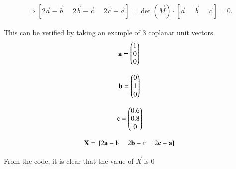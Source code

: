 \documentclass[journal]{IEEEtran}
\begin{document}
\begin{align}
\Rightarrow [2\vec{a} - \vec{b}\;\quad 2\vec{b} - \vec{c}\;\quad 2\vec{c} - \vec{a}] = \det(\vec{M}) \cdot [\vec{a}\;\quad \vec{b}\;\quad \vec{c}] = 0.
\end{align}


This can be verified by taking an example of 3 coplanar unit vectors.\\
\begin{align}
\mathbf{a} = \begin{pmatrix}1 \\ 0 \\ 0\end{pmatrix}
\end{align}

\begin{align}
\mathbf{b} = \begin{pmatrix}0 \\ 1 \\ 0\end{pmatrix}
\end{align}

\begin{align}
\mathbf{c} = \begin{pmatrix}0.6 \\ 0.8 \\ 0\end{pmatrix}
\end{align}

\begin{align}
\mathbf{X} = {}\left[2\mathbf{a}-\mathbf{b} \;\quad 2\mathbf{b}-c \;\quad 2\mathbf{c}-\mathbf{a}\right] 
\end{align}

From the code, it is clear that the value of $\vec{X}$ is $0$
\end{document}
